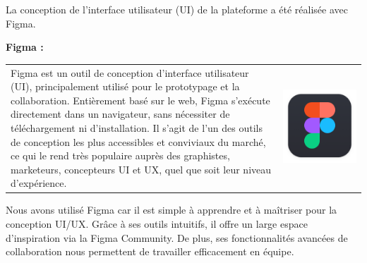 \documentclass{article}
\begin{document}
\vspace{1cm}

\noindent La conception de l’interface utilisateur (UI) de la plateforme a été réalisée avec Figma.

\vspace{0,5cm}

\noindent \textbf{Figma \cite{figmainterface}: }

\noindent
\begin{tabular}
{@{}m{}@{\hspace{1em}}m{}@{}}
Figma est un outil de conception d’interface utilisateur (UI), principalement utilisé pour le prototypage et la collaboration. Entièrement basé sur le web, Figma s’exécute directement dans un navigateur, sans nécessiter de téléchargement ni d’installation.
Il s’agit de l’un des outils de conception les plus accessibles et conviviaux du marché, ce qui le rend très populaire auprès des graphistes, marketeurs, concepteurs UI et UX, quel que soit leur niveau d’expérience.\cite{figma}
&
\includegraphics[width=\linewidth]{Figma.png} %
\end{tabular}

\noindent Nous avons utilisé Figma car il est simple à apprendre et à maîtriser pour la conception UI/UX. Grâce à ses outils intuitifs, il offre un large espace d’inspiration via la Figma Community. De plus, ses fonctionnalités avancées de collaboration nous permettent de travailler efficacement en équipe.
\end{document}
